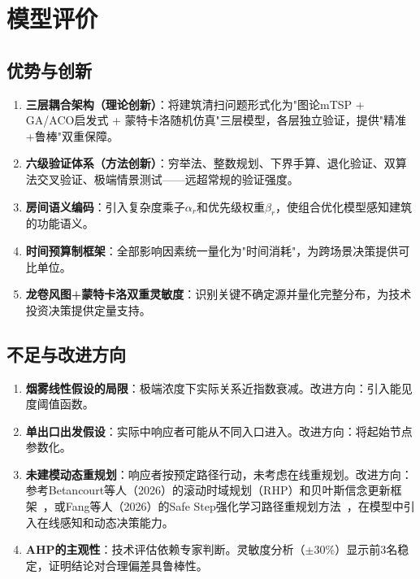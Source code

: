 \documentclass[12pt,a4paper]{ctexart}
\begin{document}
\section{模型评价}

\subsection{优势与创新}

\begin{enumerate}[label=\textbf{S\arabic*:}, leftmargin=*, nosep]
    \item \textbf{三层耦合架构（理论创新）}：将建筑清扫问题形式化为"图论mTSP + GA/ACO启发式 + 蒙特卡洛随机仿真"三层模型，各层独立验证，提供"精准+鲁棒"双重保障。
    \item \textbf{六级验证体系（方法创新）}：穷举法、整数规划、下界手算、退化验证、双算法交叉验证、极端情景测试——远超常规的验证强度。
    \item \textbf{房间语义编码}：引入复杂度乘子$\alpha_r$和优先级权重$\beta_r$，使组合优化模型感知建筑的功能语义。
    \item \textbf{时间预算制框架}：全部影响因素统一量化为"时间消耗"，为跨场景决策提供可比单位。
    \item \textbf{龙卷风图+蒙特卡洛双重灵敏度}：识别关键不确定源并量化完整分布，为技术投资决策提供定量支持。
\end{enumerate}

\subsection{不足与改进方向}

\begin{enumerate}[label=\textbf{W\arabic*:}, leftmargin=*, nosep]
    \item \textbf{烟雾线性假设的局限}：极端浓度下实际关系近指数衰减。改进方向：引入能见度阈值函数。
    \item \textbf{单出口出发假设}：实际中响应者可能从不同入口进入。改进方向：将起始节点参数化。
    \item \textbf{未建模动态重规划}：响应者按预定路径行动，未考虑在线重规划。改进方向：参考Betancourt等人（2026）的滚动时域规划（RHP）和贝叶斯信念更新框架~\cite{betancourt2026dynamic}，或Fang等人（2026）的Safe Step强化学习路径重规划方法~\cite{fang2026safestep}，在模型中引入在线感知和动态决策能力。
    \item \textbf{AHP的主观性}：技术评估依赖专家判断。灵敏度分析（$\pm$30\%）显示前3名稳定，证明结论对合理偏差具鲁棒性。
\end{enumerate}
\end{document}
